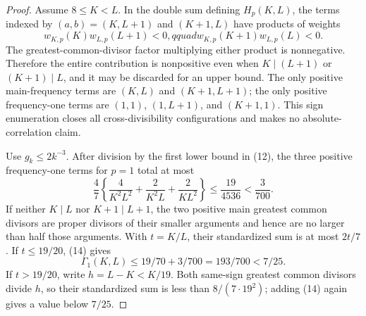 \documentclass{article}
\begin{document}
\begin{proof}
Assume \(8\leq K<L\).  In the double sum defining \(H_p(K,L)\), the terms indexed by \((a,b)=(K,L+1)\) and \((K+1,L)\) have products of weights
\[
 w_{K,p}(K)w_{L,p}(L+1)<0,qquad
 w_{K,p}(K+1)w_{L,p}(L)<0.                                                       \tag{13}
\]
The greatest-common-divisor factor multiplying either product is nonnegative.  Therefore the entire contribution is nonpositive even when \(K\mid(L+1)\) or \((K+1)\mid L\), and it may be discarded for an upper bound.  The only positive main-frequency terms are \((K,L)\) and \((K+1,L+1)\); the only positive frequency-one terms are \((1,1)\), \((1,L+1)\), and \((K+1,1)\).  This sign enumeration closes all cross-divisibility configurations and makes no absolute-correlation claim.

Use \(g_k\leq2k^{-3}\).  After division by the first lower bound in (12), the three positive frequency-one terms for \(p=1\) total at most
\[
 \frac47\left\{\frac4{K^2L^2}+\frac2{K^2L}+\frac2{KL^2}\right\}
 \leq\frac{19}{4536}<\frac3{700}.                                               \tag{14}
\]
If neither \(K\mid L\) nor \(K+1\mid L+1\), the two positive main greatest common divisors are proper divisors of their smaller arguments and hence are no larger than half those arguments.  With \(t=K/L\), their standardized sum is at most \(2t/7\).  If \(t\leq19/20\), (14) gives
\[
 \Gamma_1(K,L)\leq19/70+3/700=193/700<7/25.                                    \tag{15}
\]
If \(t>19/20\), write \(h=L-K<K/19\).  Both same-sign greatest common divisors divide \(h\), so their standardized sum is less than \(8/(7\cdot19^2)\); adding (14) again gives a value below \(7/25\).


\end{proof}
\end{document}
